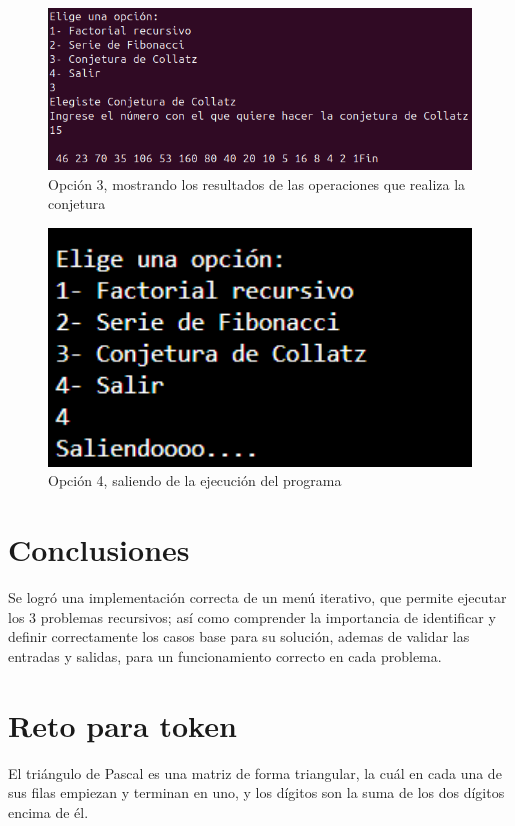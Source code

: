 \documentclass[letterpaper,12pt]{article}
\begin{document}
\begin{figure}[H]
    \centering
    \includegraphics[width=15cm]{Imagenes/Collatz.png}
    \caption*{\centering Opción 3, mostrando los resultados de las operaciones que realiza la conjetura}
\end{figure}

\begin{figure}[H]
    \centering
    \includegraphics[width=15cm]{Imagenes/saliendo.png}
    \caption*{\centering Opción 4, saliendo de la ejecución del programa}
\end{figure}

\section{Conclusiones}
Se logró una implementación correcta de un menú iterativo, que permite ejecutar los 3 problemas recursivos; así como comprender la importancia de identificar y definir correctamente los casos base para su solución, ademas de validar las entradas y salidas, para un funcionamiento correcto en cada problema.


\clearpage

\printbibliography

\clearpage

\section{Reto para token}
El triángulo de Pascal es una matriz de forma triangular, la cuál en cada una de sus filas empiezan y terminan en uno, y los dígitos son la suma de los dos dígitos encima de él.
\end{document}
